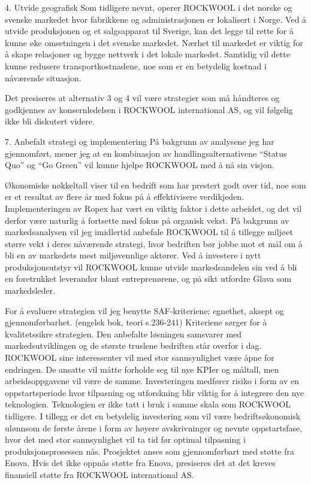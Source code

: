 4. Utvide geografisk
Som tidligere nevnt, operer ROCKWOOL i det norske og svenske markedet hvor fabrikkene og administrasjonen er lokalisert i Norge. Ved å utvide produksjonen og et salgsapparat til Sverige, kan det legge til rette for å kunne øke omsetningen i det svenske markedet. Nærhet til markedet er viktig for å skape relasjoner og bygge nettverk i det lokale markedet. Samtidig vil dette kunne redusere transportkostnadene, noe som er en betydelig kostnad i nåværende situasjon.
 
Det presiseres at alternativ 3 og 4 vil være strategier som må håndteres og godkjennes av konsernledelsen i ROCKWOOL international AS, og vil følgelig ikke bli diskutert videre.


7. Anbefalt strategi og implementering
På bakgrunn av analysene jeg har gjennomført, mener jeg at en kombinasjon av handlingsalternativene “Status Quo” og “Go Green” vil kunne hjelpe ROCKWOOL med å nå sin visjon. 

Økonomiske nøkkeltall viser til en bedrift som har prestert godt over tid, noe som er et resultat av flere år med fokus på å effektivisere verdikjeden. Implementeringen av Ropex har vært en viktig faktor i dette arbeidet, og det vil derfor være naturlig å fortsette med fokus på organisk vekst. På bakgrunn av markedsanalysen vil jeg imidlertid anbefale ROCKWOOL til å tillegge miljøet større vekt i deres nåværende strategi, hvor bedriften bør jobbe mot et mål om å bli en av markedets mest miljøvennlige aktører. Ved å investere i nytt produksjonsutstyr vil ROCKWOOL kunne utvide markedsandelen sin ved å bli en foretrukket leverandør blant entreprenørene, og på sikt utfordre Glava som markedsleder. 

For å evaluere strategien vil jeg benytte SAF-kriteriene; egnethet, aksept og gjennomførbarhet. (engelsk bok, teori s.236-241) Kriteriene sørger for å kvalitetssikre strategien. Den anbefalte løsningen samsvarer med markedsutviklingen og de største truslene bedriften står overfor i dag. ROCKWOOL sine interessenter vil med stor sannsynlighet være åpne for endringen. De ansatte vil måtte forholde seg til nye KPIer og måltall, men arbeidsoppgavene vil være de samme. Investeringen medfører risiko i form av en oppstartsperiode hvor tilpasning og utforskning blir viktig for å integrere den nye teknologien. Teknologien er ikke tatt i bruk i samme skala som ROCKWOOL tidligere. I tillegg er det en betydelig investering som vil være bedriftsøkonomisk ulønnsom de første årene i form av høyere avskrivninger og nevnte oppstartsfase, hvor det med stor sannsynlighet vil ta tid før optimal tilpasning i produksjonsprosessen nås. Prosjektet anses som gjennomførbart med støtte fra Enova. Hvis det ikke oppnås støtte fra Enova, presiseres det at det kreves finansiell støtte fra ROCKWOOL international AS.



